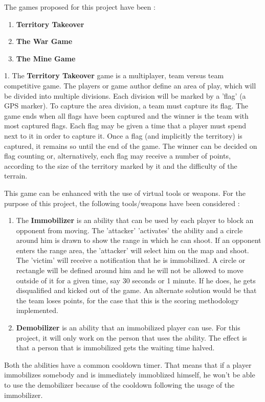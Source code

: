 \documentclass{article}
\begin{document}
The games proposed for this project have been :
\begin{enumerate}	
	\item \textbf{Territory Takeover}
	\item \textbf{The War Game}
	\item \textbf{The Mine Game}
\end{enumerate}

1. The \textbf{Territory Takeover} game is a multiplayer, team versus team
competitive game. The players or game author define an area of play, which will
be divided into multiple divisions. Each division will be marked by a 'flag' (a
GPS marker). To capture the area division, a team must capture its flag. The
game ends when all flags have been captured and the winner is the team with most
captured flags. Each flag may be given a time that a player must spend next to
it in order to capture it. Once a flag (and implicitly the territory) is
captured, it remains so until the end of the game. The winner can be decided on
flag counting or, alternatively, each flag may receive a number of points,
according to the size of the territory marked by it and the difficulty of the
terrain. \newline

This game can be enhanced with the use of virtual tools or weapons. For the
purpose of this project, the following tools/weapons have been considered :
\begin{enumerate}
	
	\item The \textbf{Immobilizer} is an ability that can be used by each player to
	block an opponent from moving. The 'attacker' 'activates' the ability and a
	circle around him is drawn to show the range in which he can shoot. If an
	opponent enters the range area, the 'attacker' will select him on the map and
	shoot. The 'victim' will receive a notification that he is immobilized. A
	circle or rectangle will be defined around him and he will not be allowed to
	move outside of it for a given time, say 30 seconds or 1 minute. If he does, he
	gets disqualified and kicked out of the game. An alternate solution would be
	that the team loses points, for the case that this is the scoring methodology
	implemented.
	 
	\item \textbf{Demobilizer} is an ability that an immobilized player can use.
	For this project, it will only work on the person that uses the ability. The
	effect is that a person that is immobilized gets the waiting time halved.
	
\end{enumerate}
Both the abilities have a common cooldown timer. That means that if a player
immobilizes somebody and is immediately immoblized himself, he won't be able to
use the demobilizer because of the cooldown following the usage of the
immobilizer.\newline
\end{document}
